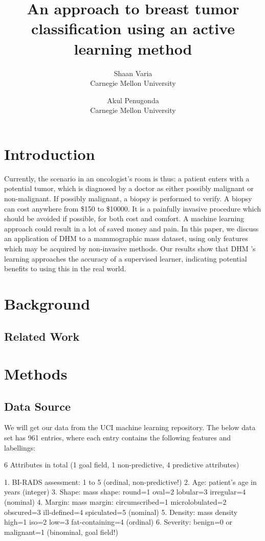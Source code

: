 \documentclass[12pt]{article}
\title{An approach to breast tumor classification using an active learning method}
\author{Shaan Varia \\ Carnegie Mellon University \and Akul Penugonda \\ Carnegie Mellon University}
\begin{document}
\maketitle

\section{Introduction}

Currently, the scenario in an oncologist's room is thus: a patient enters with a potential tumor, which is diagnosed by a doctor as either possibly malignant or non-malignant. If possibly malignant, a biopsy is performed to verify. A biopsy can cost anywhere from \$150 to \$10000. It is a painfully invasive procedure which should be avoided if possible, for both cost and comfort. A machine learning approach could result in a lot of saved money and pain. In this paper, we discuss an application of DHM to a mammographic mass dataset, using only features which may be acquired by non-invasive methods.  Our results show that DHM 's learning approaches the accuracy of a supervised learner, indicating potential benefits to using this in the real world.

\section{Background}



\subsection{Related Work}

\section{Methods}

\subsection{Data Source}

We will get our data from the UCI machine learning repository. The below data set has 961 entries, where each entry contains the following features and labellings: 

6 Attributes in total (1 goal field, 1 non-predictive, 4 predictive attributes) 

1. BI-RADS assessment: 1 to 5 (ordinal, non-predictive!) 
2. Age: patient's age in years (integer) 
3. Shape: mass shape: round=1 oval=2 lobular=3 irregular=4 (nominal) 
4. Margin: mass margin: circumscribed=1 microlobulated=2 obscured=3 ill-defined=4 spiculated=5 (nominal) 
5. Density: mass density high=1 iso=2 low=3 fat-containing=4 (ordinal) 
6. Severity: benign=0 or malignant=1 (binominal, goal field!) 
\end{document}

